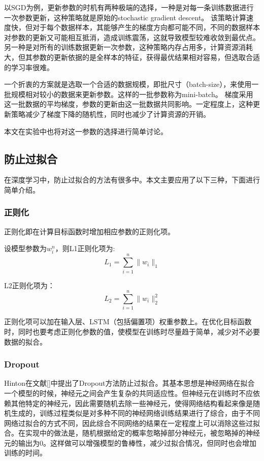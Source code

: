 以SGD为例，更新参数的时机有两种极端的选择，一种是对每一条训练数据进行一次参数更新，这种策略就是原始的stochastic gradient descent。
该策略计算速度快，但对于每个数据样本，其能够产生的梯度方向都可能不同，不同的数据样本对参数的更新又可能相互抵消，造成训练震荡，这就导致模型较难收敛到最优点。
另一种是对所有的训练数据更新一次参数，这种策略内存占用多，计算资源消耗大，但其参数的更新依据的是全样本的特征，获得最优结果相对容易，但选取合适的学习率很难。

一个折衷的方案就是选取一个合适的数据规模，即批尺寸（batch-size），来使用一批规模相对较小的数据来更新参数。这样的一批参数称为mini-batch。
梯度采用这一批数据的平均梯度，参数的更新由这一批数据共同影响。一定程度上，这种更新策略减少了梯度下降的随机性，同时也减少了计算资源的开销。

本文在实验中也将对这一参数的选择进行简单讨论。
\subsection{防止过拟合}
在深度学习中，防止过拟合的方法有很多中。本文主要应用了以下三种，下面进行简单介绍。
\subsubsection{正则化}
正则化即在计算目标函数时增加相应参数的正则化项。

设模型参数为$w_i^n$，则L1正则化项为:
\begin{equation}
    L_1 = \sum^n_{i=1}\lVert w_i \rVert_1
\end{equation}

L2正则化项为：
\begin{equation}
    L_2 = \sum^n_{i=1}\lVert w_i \rVert_2^2
\end{equation}

正则化项可以加在输入层、LSTM（包括偏置项）权重参数上。在优化目标函数时，同时也要考虑正则化参数的值，使模型在训练时尽量趋于简单，减少对不必要数据的拟合。
\subsubsection{Dropout}
Hinton在文献[]中提出了Dropout方法防止过拟合。其基本思想是神经网络在拟合一个模型的时候，神经元之间会产生复杂的共同适应性。但神经元在训练时不应依赖其他特定的神经元，因此需要随机去除一些神经元，使得网络结构看起来像是随机生成的，训练过程类似是对多种不同的神经网络训练结果进行了综合，由于不同网络过拟合的方式不同，因此综合不同网络的结果在一定程度上可以消除这些过拟合。在实现中的做法是，随机根据给定的概率忽略掉部分神经元，被忽略掉的神经元的输出为0。这样做可以增强模型的鲁棒性，减少过拟合情况，但同时也会增加训练的时间。

